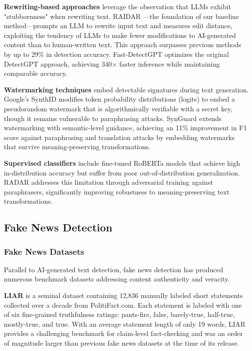 \textbf{Rewriting-based approaches} leverage the observation that LLMs exhibit "stubbornness" when rewriting text. RAIDAR \cite{mao2024raidargenerativeaidetection}---the foundation of our baseline method---prompts an LLM to rewrite input text and measures edit distance, exploiting the tendency of LLMs to make fewer modifications to AI-generated content than to human-written text. This approach surpasses previous methods by up to 29\% in detection accuracy. Fast-DetectGPT \cite{fastdetectgpt2024} optimizes the original DetectGPT approach, achieving 340× faster inference while maintaining comparable accuracy.

\textbf{Watermarking techniques} embed detectable signatures during text generation. Google's SynthID \cite{han2025robustness} modifies token probability distributions (logits) to embed a pseudorandom watermark that is algorithmically verifiable with a secret key, though it remains vulnerable to paraphrasing attacks. SynGuard \cite{synguard2024} extends watermarking with semantic-level guidance, achieving an 11\% improvement in F1 score against paraphrasing and translation attacks by embedding watermarks that survive meaning-preserving transformations.

\textbf{Supervised classifiers} include fine-tuned RoBERTa models \cite{roberta_openai} that achieve high in-distribution accuracy but suffer from poor out-of-distribution generalization. RADAR \cite{radar_openreview} addresses this limitation through adversarial training against paraphrasers, significantly improving robustness to meaning-preserving text transformations.

\subsection{Fake News Detection}

\subsubsection{Fake News Datasets}

Parallel to AI-generated text detection, fake news detection has produced numerous benchmark datasets addressing content authenticity and veracity.

\textbf{LIAR} \cite{liar2017} is a seminal dataset containing 12,836 manually labeled short statements collected over a decade from PolitiFact.com. Each statement is labeled with one of six fine-grained truthfulness ratings: pants-fire, false, barely-true, half-true, mostly-true, and true. With an average statement length of only 19 words, LIAR provides a challenging benchmark for claim-level fact-checking and was an order of magnitude larger than previous fake news datasets at the time of its release.

